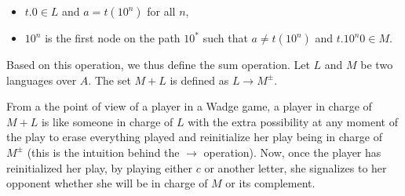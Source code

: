 \begin{itemize}
\item $t.0 \in L$ and $a = t(10^n)$ for all $n$,
\item $10^{n}$ is the first node on the path $10^*$ such that $a \neq t(10^{n})$ and $t.10^{n}0 \in M$.
\end{itemize}

Based on this operation, we thus define the sum operation.
Let $L$ and $ M $ be two languages over $A$. The set $M+ L$ is defined as $L \to M^\pm$. 

From a the point of view of a player in a Wadge game, a player in charge of $M+L$ is like someone in charge of $L$ with the extra possibility at any moment of the play to erase everything played and reinitialize her play being in charge of $M^\pm$ (this is the intuition behind the $\to$ operation). Now, once the player has reinitialized her play, by playing either $c$ or another letter, she signalizes to her opponent whether she will be in charge of $M$ or its complement.


%

\vspace{0.2cm}
 \hspace{0.1cm}

